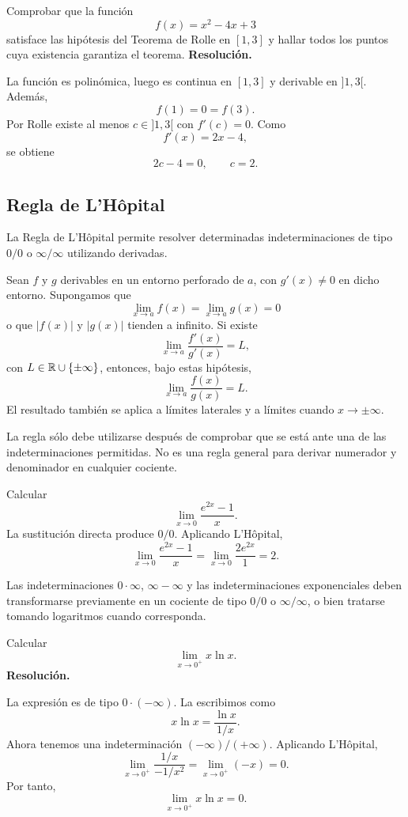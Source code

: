 \begin{solvedexercise}
Comprobar que la función
\[
f(x)=x^2-4x+3
\]
satisface las hipótesis del Teorema de Rolle en $[1,3]$ y hallar todos los puntos cuya existencia garantiza el teorema.
\tcblower
\textbf{Resolución.}\par\smallskip
La función es polinómica, luego es continua en $[1,3]$ y derivable en $]1,3[$. Además,
\[
f(1)=0=f(3).
\]
Por Rolle existe al menos $c\in]1,3[$ con $f'(c)=0$. Como
\[
f'(x)=2x-4,
\]
se obtiene
\[
2c-4=0,
\qquad
\boxed{c=2}.
\]
\end{solvedexercise}

\subsection{Regla de L'Hôpital}

La Regla de L'Hôpital permite resolver determinadas indeterminaciones de tipo $0/0$ o $\infty/\infty$ utilizando derivadas.

\begin{theorem}
Sean $f$ y $g$ derivables en un entorno perforado de $a$, con $g'(x)\neq0$ en dicho entorno. Supongamos que
\[
\lim_{x\to a}f(x)=\lim_{x\to a}g(x)=0
\]
o que $|f(x)|$ y $|g(x)|$ tienden a infinito. Si existe
\[
\lim_{x\to a}\frac{f'(x)}{g'(x)}=L,
\]
con $L\in\mathbb{R}\cup\{\pm\infty\}$, entonces, bajo estas hipótesis,
\[
\lim_{x\to a}\frac{f(x)}{g(x)}=L.
\]
El resultado también se aplica a límites laterales y a límites cuando $x\to\pm\infty$.
\end{theorem}

La regla sólo debe utilizarse después de comprobar que se está ante una de las indeterminaciones permitidas. No es una regla general para derivar numerador y denominador en cualquier cociente.

\begin{example}
Calcular
\[
\lim_{x\to0}\frac{e^{2x}-1}{x}.
\]
La sustitución directa produce $0/0$. Aplicando L'Hôpital,
\[
\lim_{x\to0}\frac{e^{2x}-1}{x}
=
\lim_{x\to0}\frac{2e^{2x}}{1}
=2.
\]
\end{example}

Las indeterminaciones $0\cdot\infty$, $\infty-\infty$ y las indeterminaciones exponenciales deben transformarse previamente en un cociente de tipo $0/0$ o $\infty/\infty$, o bien tratarse tomando logaritmos cuando corresponda.

\begin{solvedexercise}
Calcular
\[
\lim_{x\to0^+}x\ln x.
\]
\tcblower
\textbf{Resolución.}\par\smallskip
La expresión es de tipo $0\cdot(-\infty)$. La escribimos como
\[
x\ln x=\frac{\ln x}{1/x}.
\]
Ahora tenemos una indeterminación $(-\infty)/(+\infty)$. Aplicando L'Hôpital,
\[
\lim_{x\to0^+}\frac{1/x}{-1/x^2}
=
\lim_{x\to0^+}(-x)=0.
\]
Por tanto,
\[
\boxed{\lim_{x\to0^+}x\ln x=0}.
\]
\end{solvedexercise}

